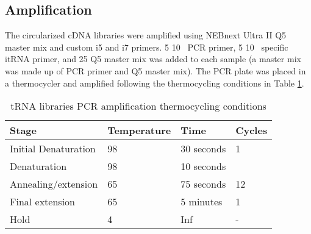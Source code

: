 \subsection{Amplification}
The circularized cDNA libraries were amplified using NEBnext Ultra II Q5 master mix and custom i5 and i7 primers.
5\ul{} 10\si{\micro\Molar} PCR primer, 5\ul{} 10\si{\micro\Molar} specific itRNA primer, and 25\ul{} Q5 master mix was added to each sample (a master mix was made up of PCR primer and Q5 master mix).
The PCR plate was placed in a thermocycler and amplified following the thermocycling conditions in Table \ref{tab:my-pcr_tRNA}.

\begin{table}[]
\centering
\begin{tabular}{|l|l|l|l|}
\hline
\rowcolor[HTML]{9B9B9B}
\textbf{Stage}       & \textbf{Temperature} & \textbf{Time} & \textbf{Cycles}      \\ \hline
Initial Denaturation & 98\C{}                  & 30 seconds    & 1                    \\ \hline
Denaturation         & 98\C{}                    & 10 seconds    &                      \\ \cline{1-3}
Annealing/extension  & 65\C{}                    & 75 seconds    & \multirow{-2}{*}{12} \\ \hline
Final extension      & 65\C{}                    & 5 minutes     & 1                    \\ \hline
Hold                 & 4\C{}                     & Inf           & -                    \\ \hline
\end{tabular}
\caption[tRNA libraries PCR amplification thermocycling conditions]{tRNA libraries PCR amplification thermocycling conditions}
\label{tab:my-pcr_tRNA}
\end{table}

